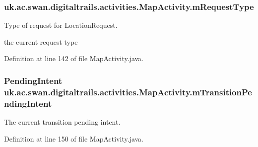 \hypertarget{classuk_1_1ac_1_1swan_1_1digitaltrails_1_1activities_1_1_map_activity_a7ed4860060db37b8cc7752265331b5ba}{
\subsubsection[{m\+Request\+Type}]{ uk.\+ac.\+swan.\+digitaltrails.\+activities.\+Map\+Activity.\+m\+Request\+Type\hspace{0.3cm}{\ttfamily [private]}}}\label{classuk_1_1ac_1_1swan_1_1digitaltrails_1_1activities_1_1_map_activity_a7ed4860060db37b8cc7752265331b5ba}


Type of request for Location\+Request. 

the current request type 

Definition at line 142 of file Map\+Activity.\+java.

\hypertarget{classuk_1_1ac_1_1swan_1_1digitaltrails_1_1activities_1_1_map_activity_ab9ae494241446e64b9d83b7aecc53855}{
\subsubsection[{m\+Transition\+Pending\+Intent}]{\setlength{\rightskip}{0pt plus 5cm}Pending\+Intent uk.\+ac.\+swan.\+digitaltrails.\+activities.\+Map\+Activity.\+m\+Transition\+Pending\+Intent\hspace{0.3cm}{\ttfamily [private]}}}\label{classuk_1_1ac_1_1swan_1_1digitaltrails_1_1activities_1_1_map_activity_ab9ae494241446e64b9d83b7aecc53855}


The current transition pending intent. 



Definition at line 150 of file Map\+Activity.\+java.

